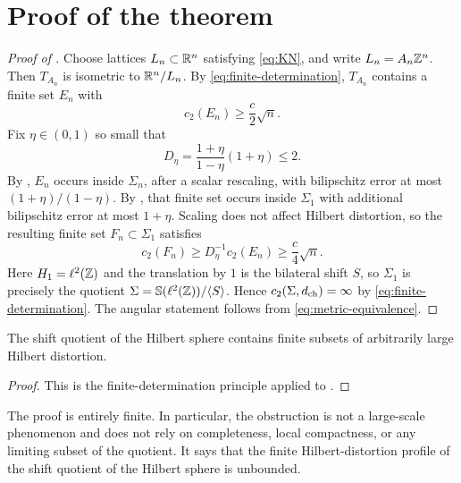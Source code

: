 \section{Proof of the theorem}

\begin{proof}[Proof of ]
Choose lattices $L_n\subset\mathbb R^n$ satisfying \eqref{eq:KN}, and write
$L_n=A_n\mathbb Z^n$.  Then $T_{A_n}$ is isometric to $\mathbb R^n/L_n$.  By
\eqref{eq:finite-determination}, $T_{A_n}$ contains a finite set $E_n$ with
\[
        c_2(E_n)\ge \frac c2\sqrt n .
\]
Fix $\eta\in(0,1)$ so small that
\[
        D_\eta=\frac{1+\eta}{1-\eta}(1+\eta)\le2 .
\]
By , $E_n$ occurs inside $\Sigma_n$, after a scalar
rescaling, with bilipschitz error at most $(1+\eta)/(1-\eta)$.  By
, that finite set occurs inside $\Sigma_1$ with
additional bilipschitz error at most $1+\eta$.  Scaling does not affect Hilbert
distortion, so the resulting finite set $F_n\subset\Sigma_1$ satisfies
\[
        c_2(F_n)\ge D_\eta^{-1}c_2(E_n)\ge \frac c4\sqrt n .
\]
Here $H_1=\ell^2(\mathbb Z)$ and the translation by $1$ is the bilateral shift $S$,
so $\Sigma_1$ is precisely the quotient
$\Sigma=\mathbb S(\ell^2(\mathbb Z))/\langle S\rangle$.  Hence
$c_2(\Sigma,d_{\rm ch})=\infty$ by \eqref{eq:finite-determination}.  The angular
statement follows from \eqref{eq:metric-equivalence}.
\end{proof}

\begin{corollary}
\label{cor:finite-distortion-profile}
\leanok
{}
The shift quotient of the Hilbert sphere contains finite subsets of arbitrarily
large Hilbert distortion.
\end{corollary}

\begin{proof}
This is the finite-determination principle applied to .
\end{proof}

\begin{remark}\label{rem:finite-proof}
The proof is entirely finite.  In particular, the obstruction is not a
large-scale phenomenon and does not rely on completeness, local compactness, or
any limiting subset of the quotient.  It says that the finite Hilbert-distortion
profile of the shift quotient of the Hilbert sphere is unbounded.
\end{remark}
